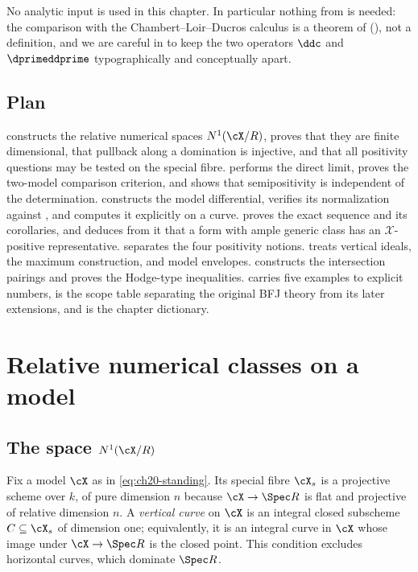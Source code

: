 No analytic input is used in this chapter.  In particular nothing from
 is needed: the comparison with the Chambert--Loir--Ducros
calculus is a theorem of 
(), not a definition, and we are careful in
 to keep the two operators \(\ddc\) and
\(\dprimeddprime\) typographically and conceptually apart.

\subsection{Plan}
\label{sec:ch20-plan}

 constructs the relative numerical spaces
\(N^1(\cX/R)\), proves that they are finite dimensional, that pullback along
a domination is injective, and that all positivity questions may be tested
on the special fibre.   performs the direct
limit, proves the two-model comparison criterion, and shows that
semipositivity is independent of the determination.
 constructs the model differential, verifies its
normalization against , and computes it explicitly
on a curve.   proves the exact sequence and its
corollaries, and  deduces from it
that a form with ample generic class has an \(\mathcal X\)-positive
representative.   separates the four positivity
notions.   treats vertical ideals, the maximum
construction, and model envelopes.   constructs
the intersection pairings and proves the Hodge-type inequalities.
 carries five examples to explicit numbers,
 is the scope table separating the original BFJ theory
from its later extensions, and  is the chapter
dictionary.

\section{Relative numerical classes on a model}
\label{sec:ch20-numerical}

\subsection{The space \texorpdfstring{\(N^1(\cX/R)\)}{N1(X/R)}}
\label{sec:ch20-n1}

Fix a model \(\cX\) as in \eqref{eq:ch20-standing}.  Its special fibre
\(\cX_s\) is a projective scheme over \(k\), of pure dimension \(n\) because
\(\cX\to\Spec R\) is flat and projective of relative dimension \(n\).  A
\emph{vertical curve} on \(\cX\) is an integral closed subscheme
\(C\subseteq\cX_s\) of dimension one; equivalently, it is an integral curve
in \(\cX\) whose image under \(\cX\to\Spec R\) is the closed point.  This
condition excludes horizontal curves, which dominate \(\Spec R\).

